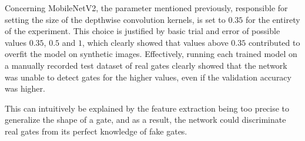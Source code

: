 Concerning MobileNetV2, the \alpha parameter mentioned previously, responsible
for setting the size of the depthwise convolution kernels, is set to $0.35$ for
the entirety of the experiment. This choice is justified by basic trial and
error of possible values $0.35$, $0.5$ and $1$, which clearly showed that
values above $0.35$ contributed to overfit the model on synthetic images.
Effectively, running each trained model on a manually recorded test dataset of
real gates clearly showed that the network was unable to detect gates for the
higher \alpha values, even if the validation accuracy was higher.

This can intuitively be explained by the feature extraction being too precise
to generalize the shape of a gate, and as a result, the network could
discriminate real gates from its perfect knowledge of fake gates.
